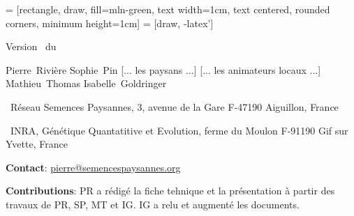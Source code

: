 


\graphicspath{{../../ressources/figures/}}





 = [rectangle, draw, fill=mln-green, text width=1cm, text centered, rounded corners, minimum height=1cm]
 = [draw, -latex']


\pagestyle{empty}

\begin{center}

\headtitlepagefiche{\logoRSPDEAP}{\formationB}

\vfill

\large
Version \versionFB~du \dateversionFB

\vfill

\normalsize

Pierre~Rivière \hspace{.5cm}
Sophie~Pin \hspace{.5cm}
[... les paysans ...] \hspace{.5cm}
[... les animateurs locaux ...] \hspace{.5cm}
Mathieu~Thomas \hspace{.5cm}
Isabelle~Goldringer \\

\end{center}

\small
\noindent{}~Réseau Semences Paysannes, 3, avenue de la Gare F-47190 Aiguillon, France 

\noindent{}~INRA, Génétique Quantatitive et Evolution, ferme du Moulon F-91190 Gif sur Yvette, France

\noindent\up{*} \textbf{Contact}: \href{mailto:pierre@semencespaysannes.org}{\textcolor{mln-green} {pierre@semencespaysannes.org}}

\noindent\textbf{Contributions}: PR a rédigé la fiche tehnique et la présentation à partir des travaux de PR, SP, MT et IG. IG a relu et augmenté les documents.

\normalsize

\vfill


